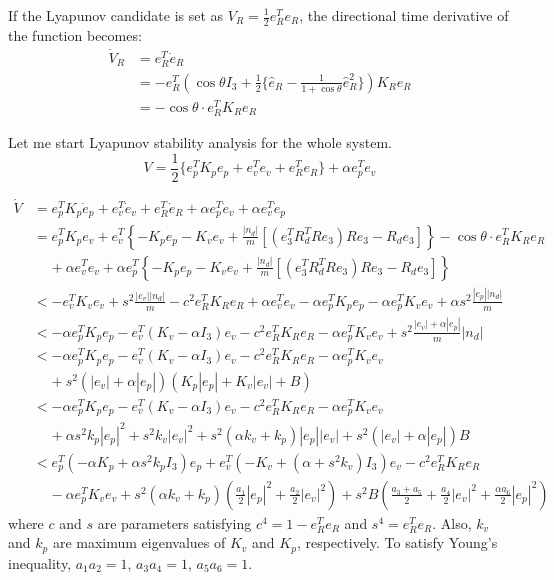 \documentclass{article}
\begin{document}
If the Lyapunov candidate is set as $V_R = \frac{1}{2}e_R^Te_R$, the directional time derivative of the function becomes:
\begin{align}
    \dot{V}_R &= e_R^T\dot{e}_R \nonumber \\
    &= -e_R^T(\cos\theta I_3 + \frac{1}{2}\{\hat{e}_R - \frac{1}{1+\cos\theta}\hat{e}_R^2\})K_Re_R \nonumber \\
    &= -\cos\theta \cdot e_R^T K_Re_R \nonumber
\end{align}

Let me start Lyapunov stability analysis for the whole system.
\begin{equation}
    V = \frac{1}{2}\{e_p^TK_pe_p + e_v^Te_v + e_R^Te_R\}+ \alpha e_p^T e_v\nonumber
\end{equation}

\begin{align}
    \dot{V} &= e_p^T K_p\dot{e}_p + e_v^T \dot{e}_v + e_R^T \dot{e}_R + \alpha e_p^T \dot{e}_v + \alpha e_v^T \dot{e}_p \nonumber \\
    &= e_p^T K_pe_v + e_v^T \left\{ -K_pe_p -K_ve_v + \frac{|n_d|}{m}\left[ (e_3^TR_d^TRe_3)Re_3-R_de_3 \right] \right\} -\cos\theta\cdot e_R^T K_R e_R  \nonumber \\
    &\;\;\;\;+\alpha e_v^T e_v + \alpha e_p^T \left\{ -K_pe_p -K_ve_v + \frac{|n_d|}{m} \left[ (e_3^TR_d^TRe_3)Re_3-R_de_3 \right] \right\}\nonumber \\
    &< -e_v^T K_v e_v + s^2 \frac{|e_v||n_d|}{m} - c^2 e_R^TK_Re_R + \alpha e_v^T e_v -\alpha e_p^TK_p e_p -\alpha e_p^TK_ve_v +\alpha s^2\frac{|e_p||n_d|}{m} \nonumber \\
    &< -\alpha e_p^TK_pe_p -e_v^T(K_v-\alpha I_3)e_v - c^2 e_R^T K_R e_R - \alpha e_p^T K_v e_v + s^2\frac{|e_v| + \alpha|e_p|}{m}|n_d| \nonumber \nonumber \\
    &< -\alpha e_p^TK_pe_p -e_v^T(K_v-\alpha I_3)e_v - c^2 e_R^T K_R e_R - \alpha e_p^T K_v e_v \nonumber \\
    &\;\;\;\;+ s^2(|e_v| + \alpha|e_p|)(K_p|e_p| + K_v |e_v| + B) \nonumber \\ 
    &< -\alpha e_p^TK_pe_p -e_v^T(K_v-\alpha I_3)e_v - c^2 e_R^T K_R e_R - \alpha e_p^T K_v e_v \nonumber \\
    &\;\;\;\;+ \alpha s^2 k_p|e_p|^2 + s^2k_v|e_v|^2 + s^2(\alpha k_v + k_p)|e_p||e_v| + s^2(|e_v| + \alpha|e_p|)B \nonumber \\ 
    &< e_p^T(-\alpha K_p + \alpha s^2 k_p I_3)e_p + e_v^T(-K_v+(\alpha + s^2 k_v) I_3)e_v - c^2 e_R^T K_R e_R \nonumber \\
    &\;\;\;\;- \alpha e_p^T K_v e_v + s^2(\alpha k_v + k_p)(\frac{a_1}{2}|e_p|^2 + \frac{a_2}{2}|e_v|^2) + s^2B(\frac{a_3+a_5}{2} + \frac{a_4}{2}|e_v|^2 +\frac{\alpha a_6}{2}|e_p|^2) \nonumber 
\end{align}
where $c$ and $s$ are parameters satisfying $c^4 = 1 - e_R^T e_R$ and $s^4 = e_R^Te_R$. Also, $k_v$ and $k_p$ are maximum eigenvalues of $K_v$ and $K_p$, respectively. 
To satisfy Young's inequality, $a_1a_2 = 1$, $a_3a_4 = 1$, $a_5a_6 = 1$.

\newpage
\end{document}
